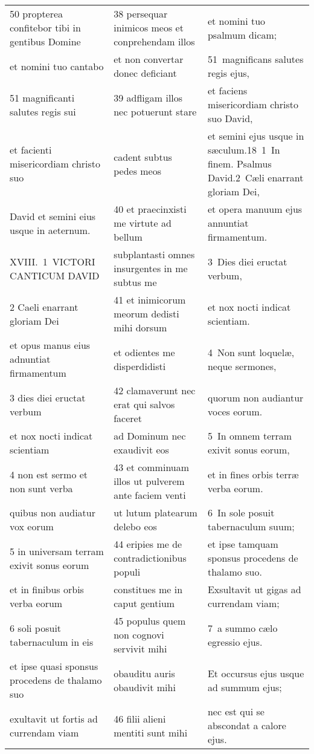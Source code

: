 \documentclass{article}
\begin{document}
\begin{longtable}{@{}p{}p{}p{}@{}}
50 propterea confitebor tibi in gentibus Domine	&	38 persequar inimicos meos et conprehendam illos	&	et nomini tuo psalmum dicam;	\\
et nomini tuo cantabo	&	et non convertar donec deficiant	&	51 magnificans salutes regis ejus,	\\
51 magnificanti salutes regis sui	&	39 adfligam illos nec potuerunt stare	&	et faciens misericordiam christo suo David,	\\
et facienti misericordiam christo suo	&	cadent subtus pedes meos	&	et semini ejus usque in sæculum.18 1 In finem. Psalmus David.2 Cæli enarrant gloriam Dei,	\\
David et semini eius usque in aeternum.	&	40 et praecinxisti me virtute ad bellum	&	et opera manuum ejus annuntiat firmamentum.	\\
XVIII. 1 VICTORI CANTICUM DAVID	&	subplantasti omnes insurgentes in me subtus me	&	3 Dies diei eructat verbum,	\\
2 Caeli enarrant gloriam Dei	&	41 et inimicorum meorum dedisti mihi dorsum	&	et nox nocti indicat scientiam.	\\
et opus manus eius adnuntiat firmamentum	&	et odientes me disperdidisti	&	4 Non sunt loquelæ, neque sermones,	\\
3 dies diei eructat verbum	&	42 clamaverunt nec erat qui salvos faceret	&	quorum non audiantur voces eorum.	\\
et nox nocti indicat scientiam	&	ad Dominum nec exaudivit eos	&	5 In omnem terram exivit sonus eorum,	\\
4 non est sermo et non sunt verba	&	43 et comminuam illos ut pulverem ante faciem venti	&	et in fines orbis terræ verba eorum.	\\
quibus non audiatur vox eorum	&	ut lutum platearum delebo eos	&	6 In sole posuit tabernaculum suum;	\\
5 in universam terram exivit sonus eorum	&	44 eripies me de contradictionibus populi	&	et ipse tamquam sponsus procedens de thalamo suo.	\\
et in finibus orbis verba eorum	&	constitues me in caput gentium	&	Exsultavit ut gigas ad currendam viam;	\\
6 soli posuit tabernaculum in eis	&	45 populus quem non cognovi servivit mihi	&	7 a summo cælo egressio ejus.	\\
et ipse quasi sponsus procedens de thalamo suo	&	obauditu auris obaudivit mihi	&	Et occursus ejus usque ad summum ejus;	\\
exultavit ut fortis ad currendam viam	&	46 filii alieni mentiti sunt mihi	&	nec est qui se abscondat a calore ejus.	\\

\end{longtable}
\end{document}

